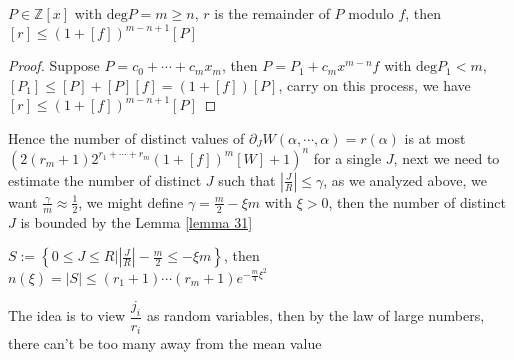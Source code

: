 \begin{lemma}\label{lemma 30}
$ P \in \mathbb{Z}[x] $ with $ \mathrm{deg} P = m \geq n $, $ r $ is the remainder of $ P $ modulo $ f $, then $ [r] \leq (1+[f])^{m-n+1}[P] $
\end{lemma}

\begin{proof}
Suppose $ P = c_{0} + \cdots + c_{m}x_{m} $, then $ P = P_{1} + c_{m}x^{m-n}f $ with $ \mathrm{deg} P_{1} < m $, $ [P_{1}] \leq [P] + [P][f] = (1+[f])[P] $, carry on this process, we have $ [r] \leq (1+[f])^{m-n+1}[P] $
\end{proof}

Hence the number of distinct values of $ \partial_{J}W(\alpha,\cdots,\alpha) = r(\alpha) $ is at most $ \left( 2(r_{m}+1)2^{r_{1}+\cdots+r_{m}}(1+[f])^{m}[W] + 1 \right)^{n} $ for a single $ J $, next we need to estimate the number of distinct $ J $ such that $ \left| \frac{J}{R} \right| \leq \gamma $, as we analyzed above, we want $ \frac{\gamma}{m} \approx \frac{1}{2} $, we  might define $ \gamma = \frac{m}{2} - \xi m $ with $ \xi > 0 $, then the number of distinct $ J $ is bounded by the Lemma \ref{lemma 31}

\begin{lemma}\label{lemma 31}
$ S := \left\{ 0 \leq J \leq R \Big| \left| \frac{J}{R} \right| - \frac{m}{2} \leq -\xi m \right\} $, 
then $ n(\xi) = |S| \leq (r_{1}+1)\cdots(r_{m}+1)e^{-\frac{m}{4}\xi^{2}} $
\end{lemma}

\begin{remark}
The idea is to view $ \dfrac{j_{i}}{r_{i}} $ as random variables, then by the law of large numbers, there 
can't be too many away from the mean value
\end{remark}

